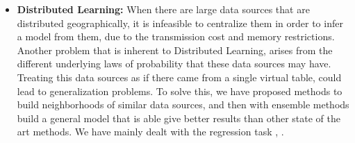 \begin{itemize}
\item \textbf{Distributed Learning:}
When there are large data sources that are distributed geographically, it is
infeasible to centralize them in order to infer a model from them, due to the
transmission cost and memory restrictions. Another problem that is inherent to
Distributed Learning, arises from the different underlying laws of probability
that these data sources may have. Treating this data sources as if there came
from a single virtual table, could lead to generalization problems. To solve
this, we have proposed methods to build neighborhoods of similar data sources,
and then with ensemble methods build a general model that is able give better
results than other state of the art methods. We have mainly dealt with the
regression task \cite{Allende13}, \cite{Allende14}. 

\end{itemize}
